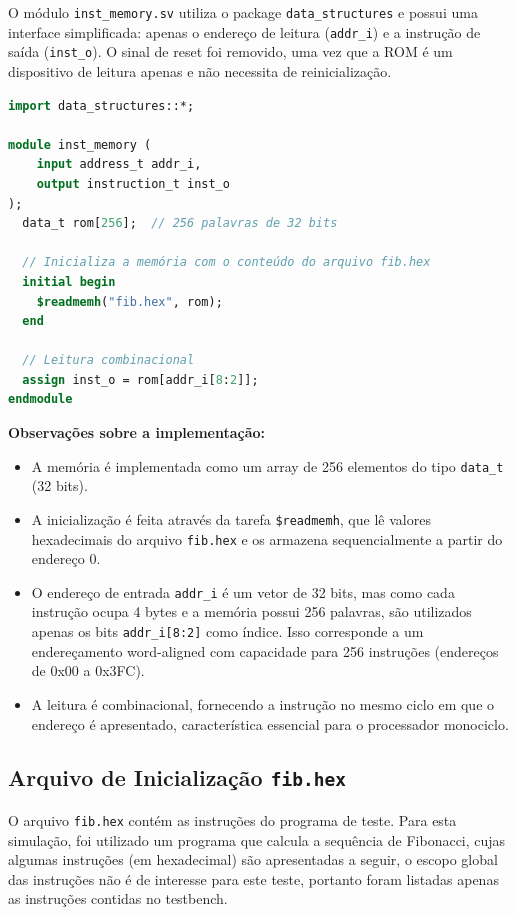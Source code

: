 \documentclass[
	12pt,				%
	oneside,
	a4paper,			%
	english,			%
	french,				%
	spanish,			%
	brazil,				%
	]{abntex2}
\begin{document}
O módulo \texttt{inst\_memory.sv} utiliza o package \texttt{data\_structures} e possui uma interface simplificada: apenas o endereço de leitura (\texttt{addr\_i}) e a instrução de saída (\texttt{inst\_o}). O sinal de reset foi removido, uma vez que a ROM é um dispositivo de leitura apenas e não necessita de reinicialização.

\begin{lstlisting}[language=SystemVerilog, caption={Módulo inst\_memory.sv}, label={lst:inst_memory}]
import data_structures::*;

module inst_memory (
    input address_t addr_i,
    output instruction_t inst_o
);
  data_t rom[256];  // 256 palavras de 32 bits

  // Inicializa a memória com o conteúdo do arquivo fib.hex
  initial begin
    $readmemh("fib.hex", rom);
  end

  // Leitura combinacional
  assign inst_o = rom[addr_i[8:2]];
endmodule
\end{lstlisting}


\textbf{Observações sobre a implementação:}
\begin{itemize}
  \item A memória é implementada como um array de 256 elementos do tipo \texttt{data\_t} (32 bits).
  \item A inicialização é feita através da tarefa \texttt{\$readmemh}, que lê valores hexadecimais do arquivo \texttt{fib.hex} e os armazena sequencialmente a partir do endereço 0.
  \item O endereço de entrada \texttt{addr\_i} é um vetor de 32 bits, mas como cada instrução ocupa 4 bytes e a memória possui 256 palavras, são utilizados apenas os bits \texttt{addr\_i[8:2]} como índice. Isso corresponde a um endereçamento word-aligned com capacidade para 256 instruções (endereços de 0x00 a 0x3FC).
  \item A leitura é combinacional, fornecendo a instrução no mesmo ciclo em que o endereço é apresentado, característica essencial para o processador monociclo.
\end{itemize}

\subsection{Arquivo de Inicialização \texttt{fib.hex}}

O arquivo \texttt{fib.hex} contém as instruções do programa de teste. Para esta simulação, foi utilizado um programa que calcula a sequência de Fibonacci, cujas algumas instruções (em hexadecimal) são apresentadas a seguir, o escopo global das instruções não é de interesse para este teste, portanto foram listadas apenas as instruções contidas no testbench.
\end{document}
